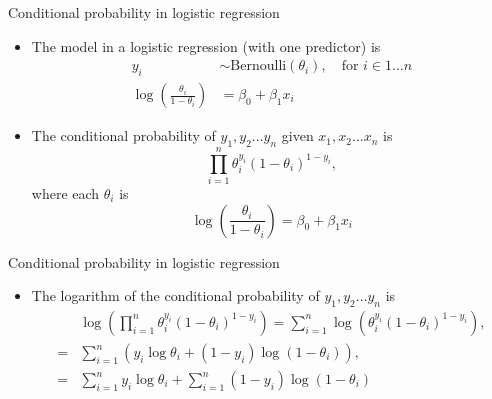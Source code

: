 \documentclass[
  10pt,
  ignorenonframetext,
]{beamer}
\providecommand{\tightlist}{%
  \setlength{\itemsep}{0pt}\setlength{\parskip}{0pt}}
\begin{document}
\begin{frame}{Conditional probability in logistic regression}
\protect\hypertarget{conditional-probability-in-logistic-regression}{}
\begin{itemize}
\item
  The model in a logistic regression (with one predictor) is \[
  \begin{aligned}
  y_i &\sim \textrm{Bernoulli}(\theta_i),\quad\text{for $i \in 1\ldots n$}\\
  \log\left(\frac{\theta_i}{1 - \theta_i}\right) &= \beta_0 + \beta_1 x_i
  \end{aligned}
  \]
\item
  The conditional probability of \(y_1, y_2 \ldots y_n\) given
  \(x_1, x_2 \ldots x_n\) is \[
  \prod_{i=1}^n \theta_i^{y_i} (1-\theta_i)^{1-y_i},
  \] where each \(\theta_i\) is \[
  \log\left(\frac{\theta_i}{1 - \theta_i}\right) 
  = \beta_0 + \beta_1 x_i
  \]
\end{itemize}
\end{frame}

\begin{frame}{Conditional probability in logistic regression}
\protect\hypertarget{conditional-probability-in-logistic-regression-1}{}
\begin{itemize}
\tightlist
\item
  The logarithm of the conditional probability of
  \(y_1, y_2 \ldots y_n\) is \[
  \begin{aligned}
  &\log\left(\prod_{i=1}^n \theta_i^{y_i} (1-\theta_i)^{1-y_i}\right) = \sum_{i=1}^n \log\left( \theta_i^{y_i} (1-\theta_i)^{1-y_i}\right),\\
  =&\sum_{i=1}^n \left( y_i \log\theta_i + (1-y_i)\log(1-\theta_i)\right),\\
  =&\sum_{i=1}^n y_i \log\theta_i + \sum_{i=1}^n (1-y_i)\log(1-\theta_i)
  \end{aligned}
  \]
\end{itemize}
\end{frame}
\end{document}
